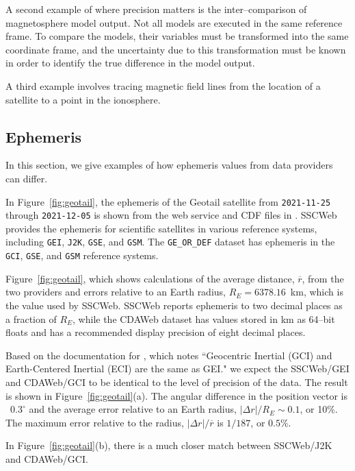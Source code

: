 \documentclass[draft]{agujournal2019}
\begin{document}
A second example of where precision matters is the inter--comparison of magnetosphere model output. Not all models are executed in the same reference frame. To compare the models, their variables must be transformed into the same coordinate frame, and the uncertainty due to this transformation must be known in order to identify the true difference in the model output.

A third example involves tracing magnetic field lines from the location of a satellite to a point in the ionosphere.


\subsection{Ephemeris}
\label{sect:comparisons_ephemeris}

In this section, we give examples of how ephemeris values from data providers can differ.

In Figure~\ref{fig:geotail}, the ephemeris of the Geotail satellite from \texttt{2021-11-25} through \texttt{2021-12-05} is shown from the  web service and CDF files in . SSCWeb provides the ephemeris for scientific satellites in various reference systems, including \texttt{GEI}, \texttt{J2K}, \texttt{GSE}, and \texttt{GSM}. The \texttt{GE\_OR\_DEF} dataset has ephemeris in the \texttt{GCI}, \texttt{GSE}, and \texttt{GSM} reference systems.

Figure~\ref{fig:geotail}, which shows calculations of the average distance, $\overline{r}$, from the two providers and errors relative to an Earth radius, $R_E=6378.16$~km, which is the value used by SSCWeb. SSCWeb reports ephemeris to two decimal places as a fraction of $R_E$, while the CDAWeb dataset has values stored in km as 64--bit floats and has a recommended display precision of eight decimal places.

Based on the documentation for , which notes ``Geocentric Inertial (GCI) and Earth-Centered Inertial (ECI) are the same as GEI." we expect the SSCWeb/GEI and CDAWeb/GCI to be identical to the level of precision of the data. The result is shown in Figure~\ref{fig:geotail}(a). The angular difference in the position vector is ~$0.3^\circ$ and the average error relative to an Earth radius, $|\Delta r|/R_E\sim 0.1$, or 10\%. The maximum error relative to the radius, $|\Delta r|/\overline{r}$ is $1/187$, or $0.5$\%.

In Figure~\ref{fig:geotail}(b), there is a much closer match between SSCWeb/J2K and CDAWeb/GCI.
\end{document}
